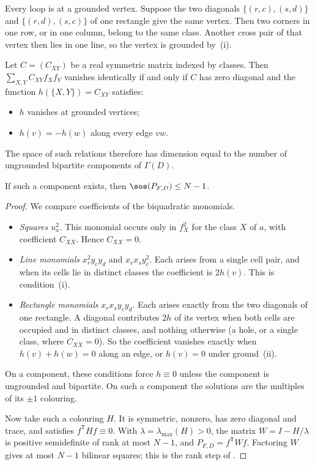 Every loop is at a grounded vertex. Suppose the two diagonals
$\{(r,c),(s,d)\}$ and $\{(r,d),(s,c)\}$ of one rectangle give the same
vertex. Then two corners in one row, or in one column, belong to the same
class. Another cross pair of that vertex then lies in one line, so the
vertex is grounded by~(i).

\begin{theorem}\label{thm:final-graph-relations}
Let $C=(C_{XY})$ be a real symmetric matrix indexed by classes. Then
$\sum_{X,Y}C_{XY}f_Xf_Y$ vanishes identically if and only if $C$ has zero
diagonal and the function $h(\{X,Y\})=C_{XY}$ satisfies:
\begin{itemize}
\item $h$ vanishes at grounded vertices;
\item $h(v)=-h(w)$ along every edge $vw$.
\end{itemize}
The space of such relations therefore has dimension equal to the number of
ungrounded bipartite components of $\Gamma(D)$.

If such a component exists, then $\sos(P_{F,D})\le N-1$.
\end{theorem}

\begin{proof}
We compare coefficients of the biquadratic monomials.
\begin{itemize}
\item \emph{Squares $u_a^2$.} This monomial occurs only in $f_X^2$ for the
      class $X$ of $a$, with coefficient $C_{XX}$. Hence $C_{XX}=0$.
\item \emph{Line monomials} $x_r^2y_cy_d$ and $x_rx_sy_c^2$. Each arises
      from a single cell pair, and when its cells lie in distinct classes
      the coefficient is $2h(v)$. This is condition~(i).
\item \emph{Rectangle monomials} $x_rx_sy_cy_d$. Each arises exactly from
      the two diagonals of one rectangle. A diagonal contributes $2h$ of its
      vertex when both cells are occupied and in distinct classes, and
      nothing otherwise (a hole, or a single class, where $C_{XX}=0$). So
      the coefficient vanishes exactly when $h(v)+h(w)=0$ along an edge,
      or $h(v)=0$ under ground~(ii).
\end{itemize}
On a component, these conditions force $h\equiv0$ unless the component is
ungrounded and bipartite. On such a component the solutions are the
multiples of its $\pm1$ colouring.

Now take such a colouring $H$. It is symmetric, nonzero, has zero diagonal
and trace, and satisfies $f^{\mathsf T}Hf\equiv0$. With
$\lambda=\lambda_{\max}(H)>0$, the matrix $W=I-H/\lambda$ is positive
semidefinite of rank at most $N-1$, and $P_{F,D}=f^{\mathsf T}Wf$.
Factoring $W$ gives at most $N-1$ bilinear squares; this is the rank step
of \cite[Lemma~2.13]{XY}.
\end{proof}

